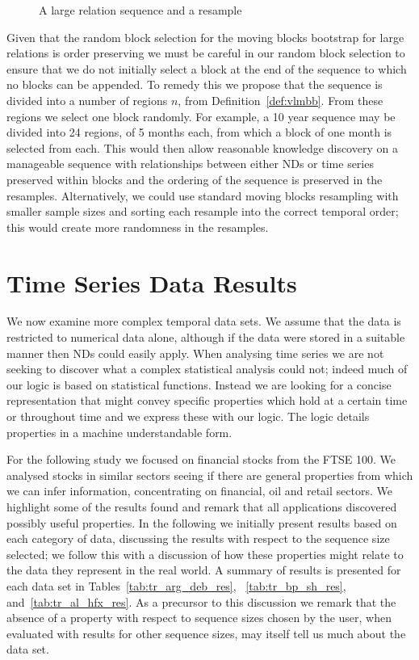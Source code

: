 \smallskip

\begin{figure}[ht]
\centerline{}
\caption{\label{fig:vlmbb}A large relation sequence and a resample}
\end{figure}

Given that the random block selection for the moving blocks bootstrap
for large relations is order preserving we must be careful in our
random block selection to ensure that we do not initially select a
block at the end of the sequence to which no blocks can be
appended. To remedy this we propose that the sequence is divided into
a number of regions $n$, from Definition~\ref{def:vlmbb}. From these
regions we select one block randomly. For example, a 10 year sequence
may be divided into 24 regions, of 5 months each, from which a block
of one month is selected from each. This would then allow reasonable
knowledge discovery on a manageable sequence with relationships
between either NDs or time series preserved within blocks and the
 ordering of the sequence is preserved in the
resamples. Alternatively, we could use standard moving blocks
resampling with smaller sample sizes and sorting each resample into
the correct temporal order; this would create more randomness in the
resamples. 

\section{Time Series Data Results}\label{sec:tr_tsares}


We now examine more complex temporal data sets. We 
assume that the data is restricted to numerical data alone, although
if the data were stored in a suitable manner then NDs
could easily apply. When analysing time series we are not seeking to
discover what a complex statistical analysis could not; indeed much of
our logic is based on statistical functions. Instead we are looking
for a concise representation that might convey specific properties
which hold at a certain time or throughout time and we express these
with our logic. The logic details properties in a machine
understandable form. 


\medskip

For the following study we focused on financial stocks from the FTSE
100. We analysed stocks in similar sectors seeing if there are general
properties from which we can infer information, concentrating on
financial, oil and retail sectors. We highlight some of the results
found and remark that all applications discovered possibly useful
properties. In the following we initially present results based on each category
of data, discussing the results with respect to the sequence size
selected; we follow this with a discussion of how these properties
might relate to the data they represent in the real world. A summary
of results is presented for each data set in
Tables~\ref{tab:tr_arg_deb_res}, ~\ref{tab:tr_bp_sh_res},
and~\ref{tab:tr_al_hfx_res}. As a precursor to this discussion we
remark that the absence of a property with respect to sequence sizes
chosen by the user, when evaluated with results for other sequence
sizes, may itself tell us much about the data set.

